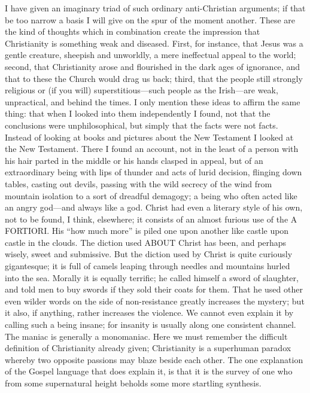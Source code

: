 I have given an imaginary triad of such ordinary anti-Christian arguments; if that be too narrow a basis I will give on the spur of the moment another. These are the kind of thoughts which in combination create the impression that Christianity is something weak and diseased. First, for instance, that Jesus was a gentle creature, sheepish and unworldly, a mere ineffectual appeal to the world; second, that Christianity arose and flourished in the dark ages of ignorance, and that to these the Church would drag us back; third, that the people still strongly religious or (if you will) superstitious—such people as the Irish—are weak, unpractical, and behind the times. I only mention these ideas to affirm the same thing: that when I looked into them independently I found, not that the conclusions were unphilosophical, but simply that the facts were not facts. Instead of looking at books and pictures about the New Testament I looked at the New Testament. There I found an account, not in the least of a person with his hair parted in the middle or his hands clasped in appeal, but of an extraordinary being with lips of thunder and acts of lurid decision, flinging down tables, casting out devils, passing with the wild secrecy of the wind from mountain isolation to a sort of dreadful demagogy; a being who often acted like an angry god—and always like a god. Christ had even a literary style of his own, not to be found, I think, elsewhere; it consists of an almost furious use of the A FORTIORI. His “how much more” is piled one upon another like castle upon castle in the clouds. The diction used ABOUT Christ has been, and perhaps wisely, sweet and submissive. But the diction used by Christ is quite curiously gigantesque; it is full of camels leaping through needles and mountains hurled into the sea. Morally it is equally terrific; he called himself a sword of slaughter, and told men to buy swords if they sold their coats for them. That he used other even wilder words on the side of non-resistance greatly increases the mystery; but it also, if anything, rather increases the violence. We cannot even explain it by calling such a being insane; for insanity is usually along one consistent channel. The maniac is generally a monomaniac. Here we must remember the difficult definition of Christianity already given; Christianity is a superhuman paradox whereby two opposite passions may blaze beside each other. The one explanation of the Gospel language that does explain it, is that it is the survey of one who from some supernatural height beholds some more startling synthesis.

